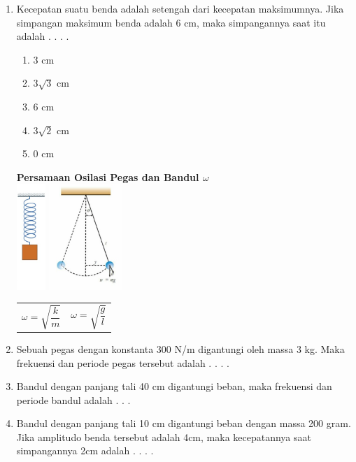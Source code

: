 \documentclass[10pt,a4paper]{extarticle}
\newcommand{\pilgani}[1]{                            \vspace{-0.3cm}\begin{multicols}{2}
 \begin{enumerate}[label=\Alph*., itemsep=0pt,topsep=0pt,leftmargin=*,align=Center]#1                     \end{enumerate}
 \phantom{ini cuma sapi, wedus, dan ayam}
 \end{multicols}}
\begin{document}
\begin{multicols*}{2}
\begin{enumerate}
\item Kecepatan suatu benda adalah setengah dari kecepatan maksimumnya. Jika simpangan maksimum benda adalah 6 cm, maka simpangannya saat itu adalah . . . .
\pilgani{
\item 3 cm
\item 3$\sqrt{3}$ cm
\item 6 cm
\item 3$\sqrt{2}$ cm
\item 0 cm
}
\vspace{5cm}

\textbf{Persamaan Osilasi Pegas dan Bandul  $\omega$}\\
\includegraphics[height=4cm]{pic/pegas}
\includegraphics[height=4cm]{pic/bandul}

\begin{tabular}{p{2cm} p{2cm}}
$$\omega=\sqrt{\frac{k}{m}}$$ & $$\omega=\sqrt{\frac{g}{l}}$$ 
\end{tabular}
\vspace{3cm}

\item Sebuah pegas dengan konstanta 300 N/m digantungi oleh massa 3 kg. Maka frekuensi dan periode pegas tersebut adalah . . . .

\vspace{3cm}

\item  Bandul dengan panjang tali 40 cm digantungi beban, maka frekuensi dan periode bandul adalah . . . 
\vspace{3cm}


\item Bandul dengan panjang tali 10 cm digantungi beban dengan massa 200 gram. Jika amplitudo benda tersebut adalah 4cm, maka kecepatannya saat simpangannya 2cm adalah . . . .


\end{enumerate}
\end{multicols*}
\end{document}
